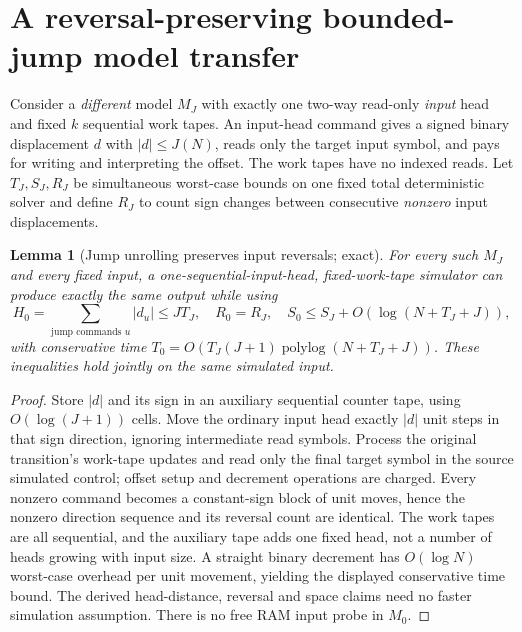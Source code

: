 \documentclass[11pt]{article}
\newtheorem{lemma}[theorem]{Lemma}
\begin{document}
\section{A reversal-preserving bounded-jump model transfer}
Consider a \emph{different} model $M_J$ with exactly one two-way
read-only \emph{input} head and fixed $k$ sequential work tapes.
An input-head command gives a signed binary displacement $d$ with
$|d|\le J(N)$, reads only the target input symbol, and pays for
writing and interpreting the offset. The work tapes have no indexed
reads. Let $T_J,S_J,R_J$ be simultaneous worst-case bounds on one
fixed total deterministic solver and define $R_J$ to count sign
changes between consecutive \emph{nonzero} input displacements.

\begin{lemma}[Jump unrolling preserves input reversals; exact]
For every such $M_J$ and every fixed input, a one-sequential-input-head,
fixed-work-tape simulator can produce exactly the same output while
using
\[
 H_0=\sum_{\text{jump commands }u}|d_u|\le JT_J,
 \quad R_0=R_J,\quad
 S_0\le S_J+O(\log(N+T_J+J)),                               \tag{10}
\]
with conservative time
$T_0=O(T_J(J+1)\operatorname{polylog}(N+T_J+J))$.
These inequalities hold jointly on the \emph{same simulated input}.
\end{lemma}
\begin{proof}
Store $|d|$ and its sign in an auxiliary sequential counter tape,
using $O(\log(J+1))$ cells. Move the ordinary input head exactly
$|d|$ unit steps in that sign direction, ignoring intermediate read
symbols. Process the original transition's work-tape updates and
read only the final target symbol in the source simulated control;
offset setup and decrement operations are charged. Every nonzero
command becomes a constant-sign block of unit moves, hence the
nonzero direction sequence and its reversal count are identical.
The work tapes are all sequential, and the auxiliary tape adds one
fixed head, not a number of heads growing with input size. A
straight binary decrement has $O(\log N)$ worst-case overhead per
unit movement, yielding the displayed conservative time bound.
The derived head-distance, reversal and space claims need no faster
simulation assumption. There is no free RAM input probe in $M_0$.
\end{proof}
\end{document}
